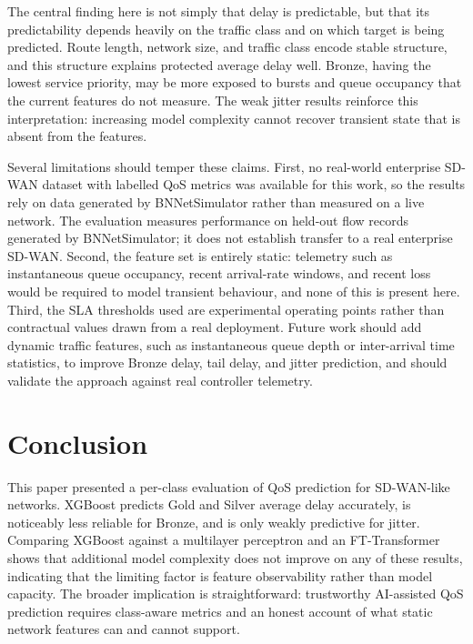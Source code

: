 \documentclass[12pt,onecolumn]{IEEEtran}
\begin{document}
The central finding here is not simply that delay is predictable, but that its predictability depends heavily on the traffic class and on which target is being predicted. Route length, network size, and traffic class encode stable structure, and this structure explains protected average delay well. Bronze, having the lowest service priority, may be more exposed to bursts and queue occupancy that the current features do not measure. The weak jitter results reinforce this interpretation: increasing model complexity cannot recover transient state that is absent from the features.

Several limitations should temper these claims. First, no real-world enterprise SD-WAN dataset with labelled QoS metrics was available for this work, so the results rely on data generated by BNNetSimulator rather than measured on a live network. The evaluation measures performance on held-out flow records generated by BNNetSimulator; it does not establish transfer to a real enterprise SD-WAN. Second, the feature set is entirely static: telemetry such as instantaneous queue occupancy, recent arrival-rate windows, and recent loss would be required to model transient behaviour, and none of this is present here. Third, the SLA thresholds used are experimental operating points rather than contractual values drawn from a real deployment. Future work should add dynamic traffic features, such as instantaneous queue depth or inter-arrival time statistics, to improve Bronze delay, tail delay, and jitter prediction, and should validate the approach against real controller telemetry.

\section{Conclusion}

This paper presented a per-class evaluation of QoS prediction for SD-WAN-like networks. XGBoost predicts Gold and Silver average delay accurately, is noticeably less reliable for Bronze, and is only weakly predictive for jitter. Comparing XGBoost against a multilayer perceptron and an FT-Transformer shows that additional model complexity does not improve on any of these results, indicating that the limiting factor is feature observability rather than model capacity. The broader implication is straightforward: trustworthy AI-assisted QoS prediction requires class-aware metrics and an honest account of what static network features can and cannot support.



\end{document}
